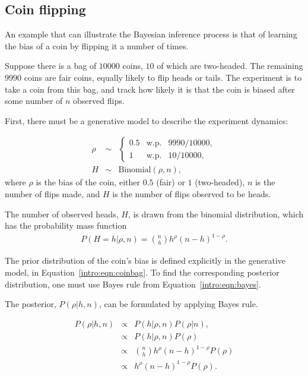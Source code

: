 \subsection{Coin flipping}

An example that can illustrate the Bayesian inference process is that of learning the bias of a coin by flipping it a number of times.

Suppose there is a bag of $10000$ coins, $10$ of which are two-headed. The remaining $9990$ coins are fair coins, equally likely to flip heads or tails. The experiment is to take a coin from this bag, and track how likely it is that the coin is biased after some number of $n$ observed flips.

First, there must be a generative model to describe the experiment dynamics:

\begin{eqnarray}
\label{intro:eqn:coinbag}\rho &\sim&
\left\{\begin{array}{lll}
0.5 & \mbox{w.p.} & 9990/10000,\\
1 & \mbox{w.p.} & 10/10000,
\end{array}\right.\\
\label{}H &\sim& \mbox{Binomial}(\rho, n),
\end{eqnarray}
where $\rho$ is the bias of the coin, either $0.5$ (fair) or $1$ (two-headed), $n$ is the number of flips made, and $H$ is the number of flips observed to be heads.

The number of observed heads, $H$, is drawn from the binomial distribution, which has the probability mass function 
\begin{eqnarray}
\label{intro:eqn:binomial} P(H=h|\rho, n) = {n \choose h} h^\rho (n-h)^{1-\rho}.
\end{eqnarray}


The prior distribution of the coin's bias is defined explicitly in the generative model, in Equation~\ref{intro:eqn:coinbag}. To find the corresponding posterior distribution, one must use Bayes rule from Equation~\ref{intro:eqn:bayes}.

The posterior, $P(\rho|h,n)$, can be formulated by applying Bayes rule.

\begin{eqnarray}
P(\rho|h,n) & \propto & P(h|\rho,n)P(\rho|n),\\
\label{intro:eqn:coinprop} & \propto & P(h|\rho,n)P(\rho)\\
&\propto& {n \choose h} h^\rho (n-h)^{1-\rho} P(\rho)\\
&\propto& h^\rho (n-h)^{1-\rho} P(\rho).
\end{eqnarray}

